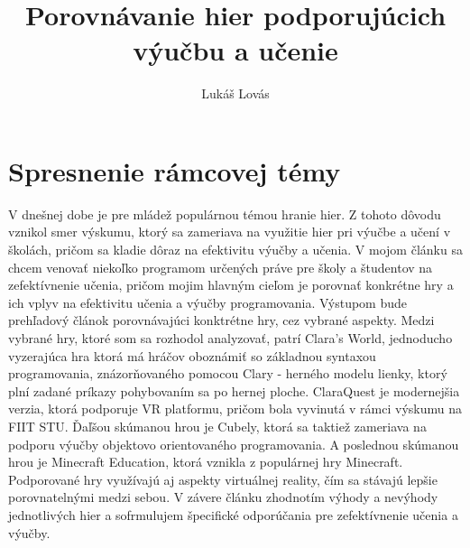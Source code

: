 \documentclass{article}
\title{Porovnávanie hier podporujúcich výučbu a učenie}
\author{Lukáš Lovás}
\begin{document}
\maketitle

\section{Spresnenie rámcovej témy}
V dnešnej dobe je pre mládež populárnou témou hranie hier. Z tohoto dôvodu vznikol smer výskumu, ktorý sa zameriava na využitie hier pri výučbe a učení v školách, pričom sa kladie dôraz na efektivitu výučby a učenia. V mojom článku sa chcem venovať niekoľko programom určených práve pre školy a študentov na zefektívnenie učenia, pričom mojim hlavným cieľom je porovnať konkrétne hry a ich vplyv na efektivitu učenia a výučby programovania. Výstupom bude prehľadový článok porovnávajúci konktrétne hry, cez vybrané aspekty. Medzi vybrané hry, ktoré som sa rozhodol analyzovať, patrí Clara's World\cite{ClarasWorld}, jednoducho vyzerajúca hra ktorá má hráčov oboznámiť so základnou syntaxou programovania, znázorňovaného pomocou Clary - herného modelu lienky, ktorý plní zadané príkazy pohybovaním sa po hernej ploche. ClaraQuest\cite{ClaraQuest} je modernejšia verzia, ktorá podporuje VR platformu, pričom bola vyvinutá v rámci výskumu na FIIT STU. Ďaľšou skúmanou hrou je Cubely\cite{Cubely}, ktorá sa taktiež zameriava na podporu výučby objektovo orientovaného programovania. A poslednou skúmanou hrou je Minecraft Education, ktorá vznikla z populárnej hry Minecraft. Podporované hry využívajú aj aspekty virtuálnej reality, čím sa stávajú lepšie porovnatelnými medzi sebou. V závere článku zhodnotím výhody a nevýhody jednotlivých hier a sofrmulujem špecifické odporúčania pre zefektívnenie učenia a výučby. 



\end{document}
